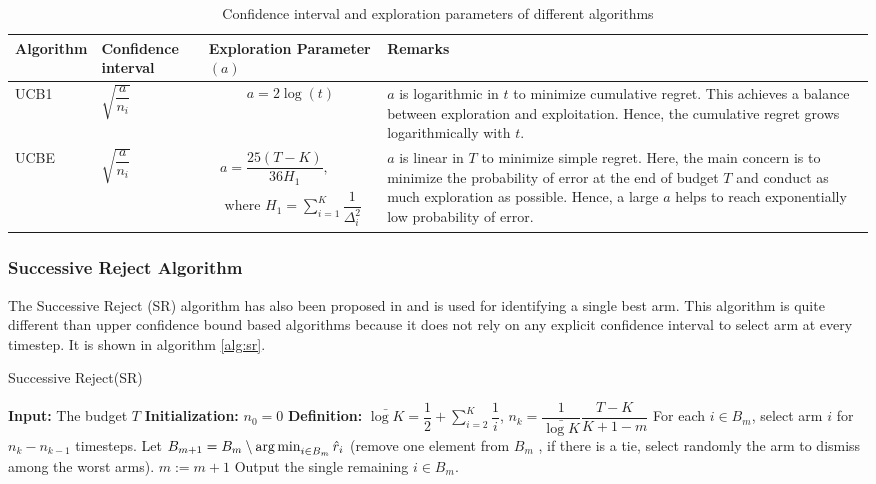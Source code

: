 \begin{table}
\caption{Confidence interval and exploration parameters of different algorithms}
\label{table:comp-exp}
\begin{center}
\begin{tabular}{|p{5em}|p{6em}|p{8em}|p{12em}|}
\hline
Algorithm  &  Confidence interval & Exploration Parameter$(a)$ & Remarks \\
\hline
\hline
UCB1       & $\sqrt{\dfrac{a}{n_i}}$ & \begin{align*}a = 2\log (t)\end{align*} & $a$ is logarithmic in $t$ to minimize cumulative regret. This achieves a balance between exploration and exploitation. Hence, the cumulative regret grows logarithmically with $t$. \\%
\hline
\hline
UCBE       & $\sqrt{\dfrac{a}{n_i}}$ & \begin{align*}a = \dfrac{25(T-K)}{36 H_1},\\ \text{ where }H_1 = \sum_{i=1}^{K}\dfrac{1}{\Delta_i^2}\end{align*} & $a$ is linear in $T$ to minimize simple regret. Here, the main concern is to minimize the probability of error at the end of budget $T$ and conduct as much exploration as possible. Hence, a large $a$ helps to reach exponentially low probability of error.\\\midrule
\end{tabular}
\end{center}
\end{table}


\subsubsection{Successive Reject Algorithm}

The Successive Reject (SR) algorithm has also been proposed in \citet{audibert2010best} and is used for identifying a single best arm. This algorithm is quite different than upper confidence bound based algorithms because it does not rely on any explicit confidence interval to select arm at every timestep. It is shown in algorithm \ref{alg:sr}.


\begin{algorithm}[!th]
\caption{Successive Reject(SR)}
\label{alg:sr}
\begin{algorithmic}[1]
\State \textbf{Input: } The budget $T$
\State \textbf{Initialization: } $n_0 = 0$
\State \textbf{Definition: } $\bar{\log K} = \dfrac{1}{2} + \sum_{i=2}^{K}\dfrac{1}{i}$, $n_k = \dfrac{1}{\bar{\log K}}\dfrac{T-K}{K + 1 - m}$
\State For each $i \in B_{m}$, select arm $i$ for $n_k - n_{k-1}$ timesteps.
\State Let $B_{m+1} = B_m\setminus \operatorname*{arg\,min}_{i\in B_m} \hat{r}_i$
(remove one element from $B_m$ , if there
is a tie, select randomly the arm to dismiss among the worst arms).
\State $m:=m+1 $
\EndFor
\State Output the single remaining $i\in B_{m}$.
\end{algorithmic}
\end{algorithm}


